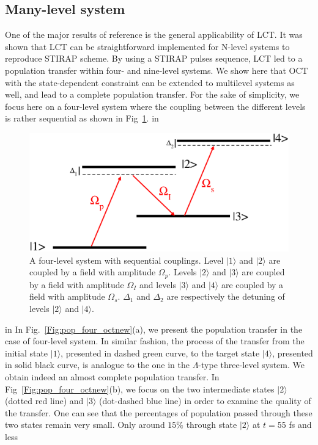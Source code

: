 \documentclass[]{interact}
\theoremstyle{plain}%
\theoremstyle{definition}
\theoremstyle{remark}
\begin{document}
\subsection{Many-level system }
One of the major results of reference \cite{Tannor} is the general 
applicability of LCT. It was shown that LCT can be straightforward implemented 
for N-level systems to reproduce STIRAP scheme. By using a STIRAP pulses 
sequence, LCT led to a population transfer within four- and nine-level systems.
We show here that OCT with the state-dependent constraint can be extended to 
multilevel systems as well, and lead to a complete population transfer. For the 
sake of simplicity, we focus here on a four-level system where the coupling 
between the different levels is rather sequential as shown in 
Fig~\ref{Fig:four_level}. 
 in
\begin{figure}
\centering
\includegraphics[width=0.5\linewidth]{Figure10}
\caption{A four-level system with sequential couplings. Level $|1\rangle$ and 
$|2\rangle$ are coupled by a field with amplitude $\Omega_p$. Levels 
$|2\rangle$ and $|3\rangle$ are coupled by a field with amplitude $\Omega_I$ 
and levels $|3\rangle$ and $|4\rangle$ are coupled by a field with amplitude 
$\Omega_s$. $\Delta_1$ and $\Delta_2$ are respectively the detuning of levels 
$|2\rangle$ and $|4\rangle$. 
\label{Fig:four_level}}
\end{figure}
 in
In Fig.~\ref{Fig:pop_four_octnew}(a), we present the population transfer in the 
case of four-level system. In similar fashion, the process of the transfer from 
the initial state $|1\rangle$, presented in dashed green curve, to the target 
state $|4\rangle$, presented in solid black curve, is analogue to the one in 
the $\Lambda$-type three-level system. 
We obtain indeed an almost complete population transfer. In 
Fig~\ref{Fig:pop_four_octnew}(b), we focus on the two intermediate states 
$|2\rangle$ (dotted red line) and $|3\rangle$ (dot-dashed blue line) in order 
to examine the quality of the transfer. One can see that the 
percentages of population passed through these two states remain very small. 
Only around $15\%$ through state $|2\rangle$ at $t=$55 fs and less 
\end{document}
